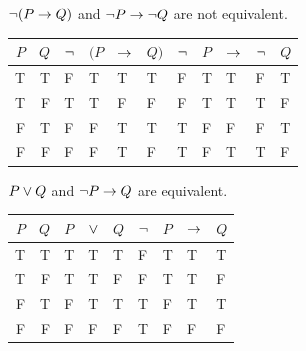 \begin{small}
\begin{earg}

\item ${\neg}(P \rightarrow Q)$ and ${\neg} P \rightarrow {\neg} Q$ are not equivalent.
\begin{flushleft}
\begin{tabular}{d d | f e e h | f e e e e}
$P$ & $Q$ & ${\neg}$ & $(P$ & $\rightarrow$ & $Q)$ & ${\neg}$ & $P$ & $\rightarrow$ & ${\neg}$ & $Q$\\
\hline
T & T &  F &   T & T & T &     F & T & T & F & T\Tstrut\\ 
T & F &  T &   T & F & F &     F & T & T & T & F\\
F & T &  F &   F & T & T &     T & F & F & F & T\\
F & F &  F &   F & T & F &     T & F & T & T & F

\end{tabular}
\end{flushleft}\medskip


\item $P \vee Q$ and ${\neg} P \rightarrow Q$ are equivalent.
\begin{flushleft}
\begin{tabular}{d d | f e h | f e e e}
$P$ & $Q$ & $P$ & $\vee$ & $Q$ & ${\neg}$ & $P$ & $\rightarrow$ & $Q$\\
\hline
T & T &    T & T & T &     F & T & T & T\Tstrut\\
T & F &    T & T & F &     F & T & T & F\\
F & T &    F & T & T &     T & F & T & T\\
F & F &    F & F & F &     T & F & F & F 
\end{tabular}
\end{flushleft}\medskip




\end{earg}
\end{small}
